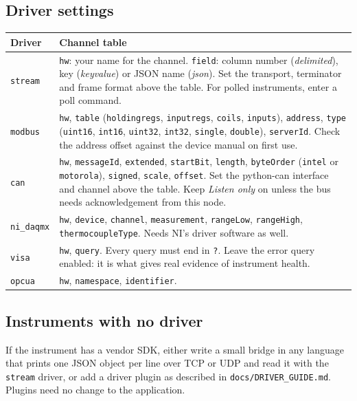 \documentclass[11pt,a4paper]{article}
\newcommand{\key}[1]{\texttt{#1}}
\begin{document}
\subsection{Driver settings}
\begin{longtable}{@{}p{27mm}p{124mm}@{}}\toprule
Driver & Channel table\\\midrule\endhead
\key{stream} & \key{hw}: your name for the channel. \key{field}: column number (\emph{delimited}), key (\emph{keyvalue}) or JSON name (\emph{json}). Set the transport, terminator and frame format above the table. For polled instruments, enter a poll command.\\
\key{modbus} & \key{hw}, \key{table} (\key{holdingregs}, \key{inputregs}, \key{coils}, \key{inputs}), \key{address}, \key{type} (\key{uint16}, \key{int16}, \key{uint32}, \key{int32}, \key{single}, \key{double}), \key{serverId}. Check the address offset against the device manual on first use.\\
\key{can} & \key{hw}, \key{messageId}, \key{extended}, \key{startBit}, \key{length}, \key{byteOrder} (\key{intel} or \key{motorola}), \key{signed}, \key{scale}, \key{offset}. Set the python-can interface and channel above the table. Keep \emph{Listen only} on unless the bus needs acknowledgement from this node.\\
\key{ni\_daqmx} & \key{hw}, \key{device}, \key{channel}, \key{measurement}, \key{rangeLow}, \key{rangeHigh}, \key{thermocoupleType}. Needs NI's driver software as well.\\
\key{visa} & \key{hw}, \key{query}. Every query must end in \key{?}. Leave the error query enabled: it is what gives real evidence of instrument health.\\
\key{opcua} & \key{hw}, \key{namespace}, \key{identifier}.\\\bottomrule
\end{longtable}

\subsection{Instruments with no driver}
If the instrument has a vendor SDK, either write a small bridge in any language that prints one JSON
object per line over TCP or UDP and read it with the \key{stream} driver, or add a driver plugin as
described in \key{docs/DRIVER\_GUIDE.md}. Plugins need no change to the application.
\end{document}
